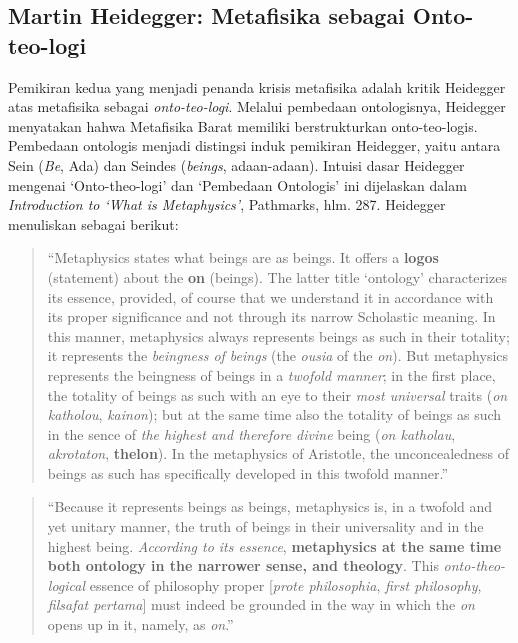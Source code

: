 \documentclass[11pt,twoside,a5paper,openany]{memoir}
\begin{document}
\hypertarget{martin-heidegger-metafisika-sebagai-onto-teo-logi}{%
\subsection{Martin Heidegger: Metafisika sebagai
Onto-teo-logi}\label{martin-heidegger-metafisika-sebagai-onto-teo-logi}}

Pemikiran kedua yang menjadi penanda krisis metafisika adalah kritik
Heidegger atas metafisika sebagai \emph{onto-teo-logi}. Melalui
pembedaan ontologisnya, Heidegger menyatakan hahwa Metafisika Barat
memiliki berstrukturkan onto-teo-logis. Pembedaan ontologis menjadi
distingsi induk pemikiran Heidegger, yaitu antara Sein (\emph{Be}, Ada)
dan Seindes (\emph{beings}, adaan-adaan). Intuisi dasar Heidegger
mengenai `Onto-theo-logi' dan `Pembedaan Ontologis' ini dijelaskan dalam
\emph{Introduction to `What is Metaphysics'}, Pathmarks, hlm. 287.
Heidegger menuliskan sebagai berikut:

\begin{quote}
``Metaphysics states what beings are as beings. It offers a
\textbf{logos} (statement) about the \textbf{on} (beings). The latter
title `ontology' characterizes its essence, provided, of course that we
understand it in accordance with its proper significance and not through
its narrow Scholastic meaning. In this manner, metaphysics always
represents beings as such in their totality; it represents the
\emph{beingness of beings} (the \emph{ousia} of the \emph{on}). But
metaphysics represents the beingness of beings in a \emph{twofold
manner}; in the first place, the totality of beings as such with an eye
to their \emph{most universal} traits (\emph{on katholou},
\emph{kainon}); but at the same time also the totality of beings as such
in the sence of \emph{the highest and therefore divine} being (\emph{on
katholau}, \emph{akrotaton}, \textbf{thelon}). In the metaphysics of
Aristotle, the unconcealedness of beings as such has specifically
developed in this twofold manner.''
\end{quote}

\begin{quote}
``Because it represents beings as beings, metaphysics is, in a twofold
and yet unitary manner, the truth of beings in their universality and in
the highest being. \emph{According to its essence}, \textbf{metaphysics
at the same time both ontology in the narrower sense, and theology}.
This \emph{onto-theo-logical} essence of philosophy proper
{[}\emph{prote philosophia}, \emph{first philosophy}, \emph{filsafat
pertama}{]} must indeed be grounded in the way in which the \emph{on}
opens up in it, namely, as \emph{on}.''
\end{quote}
\end{document}
